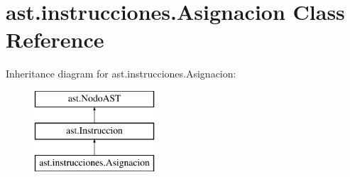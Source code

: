\hypertarget{classast_1_1instrucciones_1_1_asignacion}{}\section{ast.\+instrucciones.\+Asignacion Class Reference}
\label{classast_1_1instrucciones_1_1_asignacion}
Inheritance diagram for ast.\+instrucciones.\+Asignacion\+:\begin{figure}[H]
\begin{center}
\leavevmode
\includegraphics[height=3.000000cm]{classast_1_1instrucciones_1_1_asignacion}
\end{center}
\end{figure}
